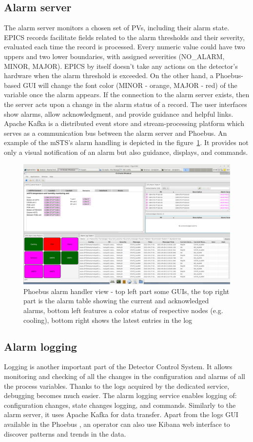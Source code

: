 \subsection{Alarm server}
The alarm server monitors a chosen set of \gls{PV}s, including their alarm state. EPICS records facilitate fields related to the alarm thresholds and their severity, evaluated each time the record is processed. Every numeric value could have two uppers and two lower boundaries, with assigned severities (NO\_ALARM, MINOR, MAJOR). EPICS by itself doesn't take any actions on the detector's hardware when the alarm threshold is exceeded. On the other hand, a Phoebus-based GUI will change the font color (MINOR - orange, MAJOR - red) of the variable once the alarm appears. If the connection to the alarm server exists, then the server acts upon a change in the alarm status of a record. The user interfaces show alarms, allow acknowledgment, and provide guidance and helpful links. Apache Kafka is a distributed event store and stream-processing platform which serves as a communication bus between the alarm server and Phoebus. An example of the mSTS's alarm handling is depicted in the figure~\ref{fig_alarm1}. It provides not only a visual notification of an alarm but also guidance, displays, and commands.
\begin{figure}[!h]
\centering
\includegraphics[width=0.75\columnwidth]{Chapter3/DCS/images/alarms.png}
\caption{Phoebus alarm handler view -  top left part some \gls{GUI}s, the top right part is the alarm table showing the current and acknowledged alarms, bottom left features a color status of respective nodes (e.g. cooling), bottom right shows the latest entries in the log}
\label{fig_alarm1}
\end{figure}
\newpage
\subsection{Alarm logging}
Logging is another important part of the Detector Control System. It allows monitoring and checking of all the changes in the configuration and alarms of all the process variables. Thanks to the logs acquired by the dedicated service, debugging becomes much easier. The alarm logging service enables logging of: configuration changes, state changes logging, and commands. Similarly to the alarm server, it uses Apache Kafka for data transfer. Apart from the logs \gls{GUI} available in the Phoebus \cite{alarm_logger}, an operator can also use Kibana web interface to discover patterns and trends in the data. 

